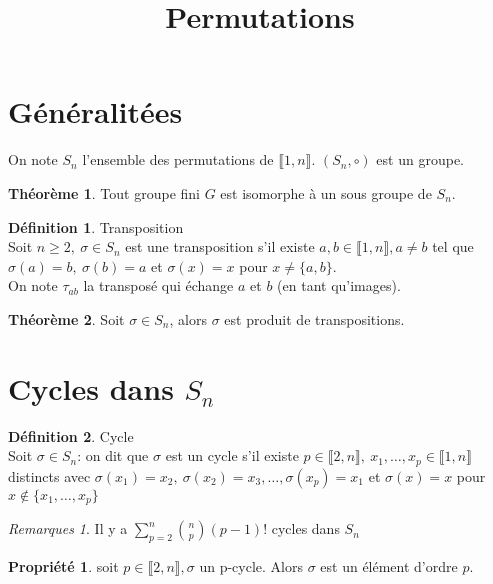 \documentclass[fleqn]{article}
\title{Permutations}
\date{}
\theoremstyle{definition} \newtheorem*{defi}{D\'efinition}
\theoremstyle{definition} \newtheorem*{theo}{Th\'eor\`eme}
\theoremstyle{definition} \newtheorem*{coro}{Corollaire}
\theoremstyle{definition} \newtheorem*{nota}{Notation}
\theoremstyle{definition} \newtheorem*{vocab}{Vocabulaire}
\theoremstyle{remark} \newtheorem*{rqs}{Remarques}
\theoremstyle{definition} \newtheorem*{prop}{Propri\'et\'e}
\begin{document}
\maketitle

\section{G\'en\'eralit\'ees}
On note $S_n$ l'ensemble des permutations de $\llbracket 1,n \rrbracket $. $(S_n, \circ)$ est un groupe.

\begin{theo}
	Tout groupe fini $G$ est isomorphe \`a un sous groupe de $S_n$.
\end{theo}

\begin{defi} Transposition\\
	Soit $n \geq 2,\ \sigma \in S_n$ est une transposition s'il existe $a,b \in \llbracket 1,n \rrbracket , a \neq b$ tel que $\sigma(a) = b,\ \sigma(b) = a$ et
	$\sigma(x) = x$ pour $x \neq \{a,b\}$. \\
	On note $\tau_{ab}$ la transpos\'e qui \'echange $a$ et $b$ (en tant qu'images).
\end{defi}

\begin{theo}
	Soit $\sigma \in S_n$, alors $\sigma$ est produit de transpositions.
\end{theo}

\section{Cycles dans $S_n$}

\begin{defi} Cycle\\
	Soit $\sigma \in S_n$: on dit que $\sigma$ est un cycle s'il existe $p \in \llbracket 2,n \rrbracket ,\ x_1, \hdots, x_p \in \llbracket 1,n \rrbracket $ distincts avec
	$\sigma(x_1) = x_2,\ \sigma(x_2) = x_3, \hdots, \sigma(x_p) = x_1$ et $\sigma(x) = x$ pour \mbox{$x \notin \{x_1, \hdots, x_p\}$}
	\begin{rqs}
		Il y a $\sum_{p=2}^n \binom{n}{p}(p-1)!$ cycles dans $S_n$
	\end{rqs}
\end{defi}

\begin{prop}
	soit $p \in \llbracket 2,n \rrbracket , \sigma$ un p-cycle. Alors $\sigma$ est un \'el\'ement d'ordre $p$.
\end{prop}
\end{document}
